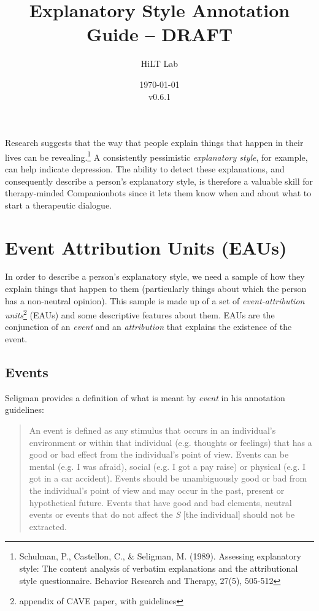 \documentclass[a4paper,12pt]{article}
\begin{document}
\title{Explanatory Style Annotation Guide -- DRAFT}
\author{HiLT Lab}
\date{\today\\v0.6.1}
\maketitle

\tableofcontents
\break

Research suggests that the way that people explain things that happen in their lives can be revealing.\footnote{\label{seligman89}Schulman, P., Castellon, C., \& Seligman, M. (1989). Assessing explanatory style: The content analysis of verbatim explanations and the attributional style questionnaire. Behavior Research and Therapy, 27(5), 505-512} %
A consistently pessimistic \emph{explanatory style}, for example, can help indicate depression.
The ability to detect these explanations, and consequently describe a person's explanatory style, is therefore a valuable skill for therapy-minded Companionbots since it lets them know when and about what to start a therapeutic dialogue.

\section{Event Attribution Units (EAUs)}
In order to describe a person's explanatory style, we need a sample of how they explain things that happen to them (particularly things about which the person has a non-neutral opinion). %
This sample is made up of a set of \emph{event-attribution units}\footnote{\label{CAVE}appendix of CAVE paper, with guidelines} (EAUs) and some descriptive features about them. %
EAUs are the conjunction of an \emph{event} and an \emph{attribution} that explains the existence of the event.


\subsection{Events}

Seligman provides a definition of what is meant by \emph{event} in his annotation guidelines: %

\begin{quote}
    An event is defined as any stimulus that occurs in an individual's environment or within that individual (e.g. thoughts or feelings) that has a good or bad effect from the individual's point of view.
    Events can be mental (e.g. I was afraid), social (e.g. I got a pay raise) or physical (e.g. I got in a car accident).
    Events should be unambiguously good or bad from the individual's point of view and may occur in the past, present or hypothetical future.
    Events that have good and bad elements, neutral events or events that do not affect the \emph{S} [the individual] should not be extracted.
\end{quote}
\end{document}
